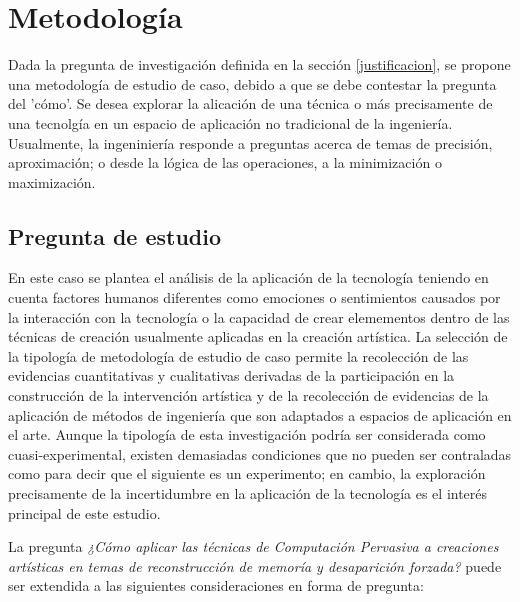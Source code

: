\section{Metodología}

Dada la pregunta de investigación definida en la sección \ref{justificacion}, se propone una metodología de estudio de caso\cite{robertkyin}, debido a que se debe contestar la pregunta del 'cómo'. Se desea explorar la alicación de una técnica o más precisamente de una tecnolgía en un espacio de aplicación no tradicional de la ingeniería. Usualmente, la ingeniniería responde a preguntas acerca de temas de precisión, aproximación; o desde la lógica de las operaciones, a la minimización o maximización.

\subsection{Pregunta de estudio}

En este caso se plantea el análisis de la aplicación de la tecnología teniendo en cuenta factores humanos diferentes como emociones o sentimientos causados por la interacción con la tecnología o la capacidad de crear elemementos dentro de las técnicas de creación usualmente aplicadas en la creación artística. La selección de la tipología de metodología de estudio de caso permite la recolección de las evidencias cuantitativas y cualitativas derivadas de la participación en la construcción de la intervención artística y de la recolección de evidencias de la aplicación de métodos de ingeniería que son adaptados a espacios de aplicación en el arte. Aunque la tipología de esta investigación podría ser considerada como cuasi-experimental, existen demasiadas condiciones que no pueden ser contraladas como para decir que el siguiente es un experimento; en cambio, la exploración precisamente de la incertidumbre en la aplicación de la tecnología es el interés principal de este estudio.

La pregunta \textit{¿Cómo aplicar las técnicas de Computación Pervasiva a creaciones artísticas en temas de reconstrucción de memoría y desaparición forzada?} puede ser extendida a las siguientes consideraciones en forma de pregunta:

